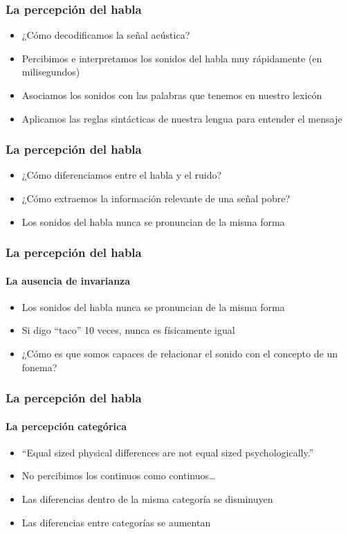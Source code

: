 \documentclass{beamer}
\begin{document}
\begin{frame}
	\frametitle{La percepción del habla}

	\begin{itemize}
		\item ¿Cómo decodificamos la señal acústica?
		\item Percibimos e interpretamos los sonidos del habla muy rápidamente (en milisegundos)
		\item Asociamos los sonidos con las palabras que tenemos en nuestro lexicón
		\item Aplicamos las reglas sintácticas de nuestra lengua para entender el mensaje
	\end{itemize}
\end{frame}

\begin{frame}
	\frametitle{La percepción del habla}
	
	\begin{itemize}
		\item ¿Cómo diferenciamos entre el habla y el ruido?
		\item ¿Cómo extraemos la información relevante de una señal pobre?
		\item Los sonidos del habla nunca se pronuncian de la misma forma
	\end{itemize}
\end{frame}

\begin{frame}
	\frametitle{La percepción del habla}
	\framesubtitle{La ausencia de invarianza}

	\begin{itemize}
		\item Los sonidos del habla nunca se pronuncian de la misma forma
		\item Si digo ``taco'' \textipa{[\textprimstress ta.ko]} 10 veces, nunca es físicamente igual 
		\item ¿Cómo es que somos capaces de relacionar el sonido con el concepto de un fonema?
	\end{itemize}

\end{frame}

\begin{frame}
	\frametitle{La percepción del habla}
	\framesubtitle{La percepción categórica}

	\begin{itemize}
		\item ``Equal sized physical differences are not equal sized psychologically.''
		\item No percibimos los continuos como continuos\ldots
		\item Las diferencias dentro de la misma categoría se disminuyen 
		\item Las diferencias entre categorías se aumentan
	\end{itemize}
\end{frame}
\end{document}
